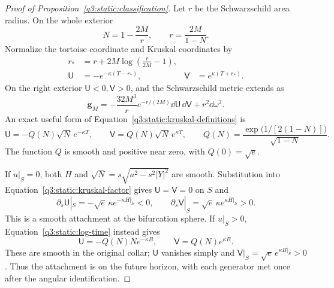 \begin{proof}[Proof of Proposition~\ref{q3:static:classification}]
Let \(r\) be the Schwarzschild area radius. On the whole exterior
\[
N=1-\frac{2M}{r},\qquad
r=\frac{2M}{1-N}.
\]
Normalize the tortoise coordinate and Kruskal coordinates by
\begin{equation}
\label{q3:static:kruskal-definitions}
\begin{aligned}
r_*&=r+2M\log\left(\frac r{2M}-1\right),\\
\mathsf U&=-e^{-\kappa(T-r_*)},&
\mathsf V&= e^{\kappa(T+r_*)}.
\end{aligned}
\end{equation}
On the right exterior \(\mathsf U<0,\mathsf V>0\), and
the Schwarzschild metric extends as
\[
\mathbf g_M
=-\frac{32M^3}{r}e^{-r/(2M)}
   \dd\mathsf U\,\dd\mathsf V+r^2\dd\omega^2.
\]
An exact useful form of Equation~\eqref{q3:static:kruskal-definitions}
is
\begin{equation}
\label{q3:static:kruskal-factor}
\mathsf U=-Q(N)\sqrt N\,e^{-\kappa T},\qquad
\mathsf V= Q(N)\sqrt N\,e^{\kappa T},\qquad
Q(N)=\frac{\exp\!\bigl(1/[2(1-N)]\bigr)}{\sqrt{1-N}}.
\end{equation}
The function \(Q\) is smooth and positive near zero, with
\(Q(0)=\sqrt e\).

If \(u|_S=0\), both \(H\) and
\(\sqrt N=s\sqrt{a^2-s^2|Y|^2}\) are smooth.
Substitution into Equation~\eqref{q3:static:kruskal-factor} gives
\(\mathsf U=\mathsf V=0\) on \(S\) and
\[
\partial_s\mathsf U|_S
=-\sqrt e\,\kappa e^{-\kappa H|_S}<0,\qquad
\partial_s\mathsf V|_S
=\sqrt e\,\kappa e^{\kappa H|_S}>0.
\]
This is a smooth attachment at the bifurcation sphere.
If \(u|_S>0\), Equation~\eqref{q3:static:log-time} instead gives
\begin{equation}
\label{q3:static:future-attachment}
\mathsf U=-Q(N)N e^{-\kappa B},\qquad
\mathsf V=Q(N)e^{\kappa B}.
\end{equation}
These are smooth in the original collar;
\(\mathsf U\) vanishes simply and
\(\mathsf V|_S=\sqrt e\,e^{\kappa B|_S}>0\).
Thus the attachment is on the future horizon, with each generator
met once after the angular identification.


\end{proof}
